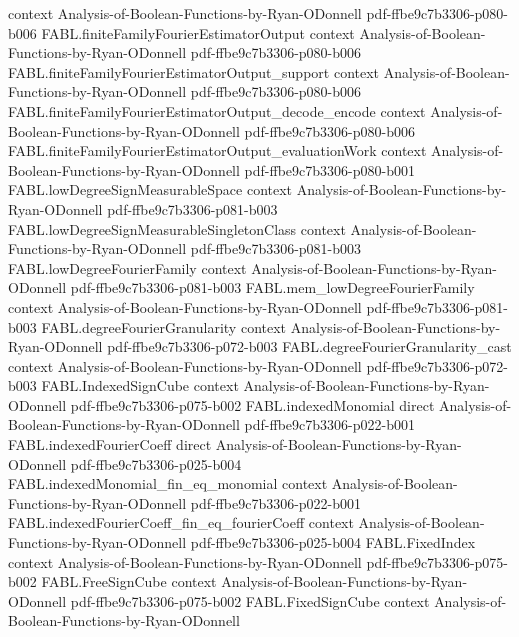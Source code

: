 \begin{theorem}
  {context}
  {Analysis-of-Boolean-Functions-by-Ryan-ODonnell}
  {pdf-ffbe9c7b3306-p080-b006}
\proofstep
  {FABL.finiteFamilyFourierEstimatorOutput}
  {context}
  {Analysis-of-Boolean-Functions-by-Ryan-ODonnell}
  {pdf-ffbe9c7b3306-p080-b006}
\proofstep
  {FABL.finiteFamilyFourierEstimatorOutput_support}
  {context}
  {Analysis-of-Boolean-Functions-by-Ryan-ODonnell}
  {pdf-ffbe9c7b3306-p080-b006}
\proofstep
  {FABL.finiteFamilyFourierEstimatorOutput_decode_encode}
  {context}
  {Analysis-of-Boolean-Functions-by-Ryan-ODonnell}
  {pdf-ffbe9c7b3306-p080-b006}
\proofstep
  {FABL.finiteFamilyFourierEstimatorOutput_evaluationWork}
  {context}
  {Analysis-of-Boolean-Functions-by-Ryan-ODonnell}
  {pdf-ffbe9c7b3306-p080-b001}
\proofstep
  {FABL.lowDegreeSignMeasurableSpace}
  {context}
  {Analysis-of-Boolean-Functions-by-Ryan-ODonnell}
  {pdf-ffbe9c7b3306-p081-b003}
\proofstep
  {FABL.lowDegreeSignMeasurableSingletonClass}
  {context}
  {Analysis-of-Boolean-Functions-by-Ryan-ODonnell}
  {pdf-ffbe9c7b3306-p081-b003}
\proofstep
  {FABL.lowDegreeFourierFamily}
  {context}
  {Analysis-of-Boolean-Functions-by-Ryan-ODonnell}
  {pdf-ffbe9c7b3306-p081-b003}
\proofstep
  {FABL.mem_lowDegreeFourierFamily}
  {context}
  {Analysis-of-Boolean-Functions-by-Ryan-ODonnell}
  {pdf-ffbe9c7b3306-p081-b003}
\proofstep
  {FABL.degreeFourierGranularity}
  {context}
  {Analysis-of-Boolean-Functions-by-Ryan-ODonnell}
  {pdf-ffbe9c7b3306-p072-b003}
\proofstep
  {FABL.degreeFourierGranularity_cast}
  {context}
  {Analysis-of-Boolean-Functions-by-Ryan-ODonnell}
  {pdf-ffbe9c7b3306-p072-b003}
\proofstep
  {FABL.IndexedSignCube}
  {context}
  {Analysis-of-Boolean-Functions-by-Ryan-ODonnell}
  {pdf-ffbe9c7b3306-p075-b002}
\proofstep
  {FABL.indexedMonomial}
  {direct}
  {Analysis-of-Boolean-Functions-by-Ryan-ODonnell}
  {pdf-ffbe9c7b3306-p022-b001}
\proofstep
  {FABL.indexedFourierCoeff}
  {direct}
  {Analysis-of-Boolean-Functions-by-Ryan-ODonnell}
  {pdf-ffbe9c7b3306-p025-b004}
\proofstep
  {FABL.indexedMonomial_fin_eq_monomial}
  {context}
  {Analysis-of-Boolean-Functions-by-Ryan-ODonnell}
  {pdf-ffbe9c7b3306-p022-b001}
\proofstep
  {FABL.indexedFourierCoeff_fin_eq_fourierCoeff}
  {context}
  {Analysis-of-Boolean-Functions-by-Ryan-ODonnell}
  {pdf-ffbe9c7b3306-p025-b004}
\proofstep
  {FABL.FixedIndex}
  {context}
  {Analysis-of-Boolean-Functions-by-Ryan-ODonnell}
  {pdf-ffbe9c7b3306-p075-b002}
\proofstep
  {FABL.FreeSignCube}
  {context}
  {Analysis-of-Boolean-Functions-by-Ryan-ODonnell}
  {pdf-ffbe9c7b3306-p075-b002}
\proofstep
  {FABL.FixedSignCube}
  {context}
  {Analysis-of-Boolean-Functions-by-Ryan-ODonnell}

\end{theorem}
